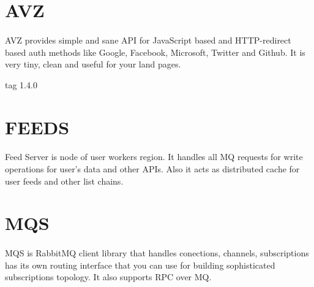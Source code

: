 \documentclass[11pt]{article}
\begin{document}
\section*{AVZ}
\paragraph{}
AVZ provides simple and sane API for JavaScript based and HTTP-redirect
based auth methods like Google, Facebook, Microsoft, Twitter and Github.
It is very tiny, clean and useful for your land pages.

 tag 1.4.0

\section*{FEEDS}
\paragraph{}
Feed Server is node of user workers region. It handles all MQ
requests for write operations for user's data and other APIs.
Also it acts as distributed cache for user feeds and other list chains.



\section*{MQS}
\paragraph{}
MQS is RabbitMQ client library that handles conections, channels,
subscriptions has its own routing interface that you can use for building
sophisticated subscriptions topology. It also supports RPC over MQ.






\qquad

\end{document}
